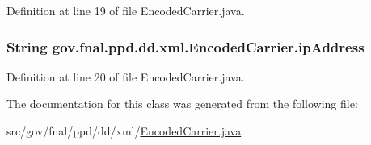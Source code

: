 Definition at line 19 of file Encoded\-Carrier.\-java.

\hypertarget{classgov_1_1fnal_1_1ppd_1_1dd_1_1xml_1_1EncodedCarrier_a28c58a66382080af31eed8d56a53b62a}{
\subsubsection[{ip\-Address}]{\setlength{\rightskip}{0pt plus 5cm}String gov.\-fnal.\-ppd.\-dd.\-xml.\-Encoded\-Carrier.\-ip\-Address\hspace{0.3cm}{\ttfamily [protected]}}}\label{classgov_1_1fnal_1_1ppd_1_1dd_1_1xml_1_1EncodedCarrier_a28c58a66382080af31eed8d56a53b62a}


Definition at line 20 of file Encoded\-Carrier.\-java.



The documentation for this class was generated from the following file\-:\begin{DoxyCompactItemize}
\item 
src/gov/fnal/ppd/dd/xml/\hyperlink{EncodedCarrier_8java}{Encoded\-Carrier.\-java}\end{DoxyCompactItemize}
